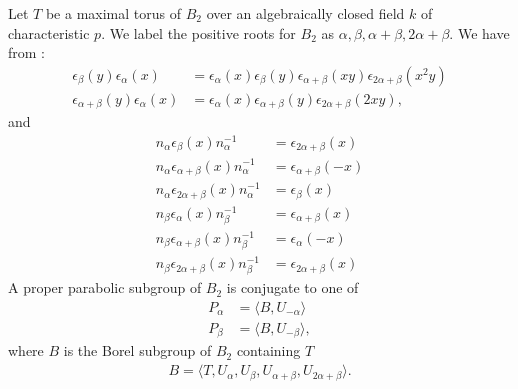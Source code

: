 																										Let $T$ be a maximal torus of $B_2$ over an algebraically closed field $k$ of characteristic $p$. We label the positive roots for $B_2$ as $\alpha, \beta, \alpha + \beta, 2\alpha + \beta$. We have from \cite[\S 33.4]{humphreys1975linear}:
																										\begin{align*}
																										\epsilon_\beta (y) \epsilon_\alpha (x) &= \epsilon_\alpha (x) \epsilon_\beta (y) \epsilon_{\alpha + \beta} (xy) \epsilon_{2\alpha+\beta} (x^2y) \\
																																															\epsilon_{\alpha + \beta} (y) \epsilon_\alpha (x) &= \epsilon_\alpha (x) \epsilon_{\alpha + \beta} (y) \epsilon_{2\alpha + \beta} (2xy),
																										\end{align*}
																										and 
																										\begin{align*}
																										n_\alpha \epsilon_\beta(x) n_\alpha^{-1} &= \epsilon_{2\alpha+\beta}(x)\\
																											n_\alpha \epsilon_{\alpha+\beta}(x) n_\alpha^{-1} &= \epsilon_{\alpha+\beta}(-x)\\
																											n_\alpha \epsilon_{2\alpha+\beta}(x) n_\alpha^{-1} &= \epsilon_{\beta}(x)\\
																											n_\beta \epsilon_\alpha(x) n_\beta^{-1} &= \epsilon_{\alpha+\beta}(x)\\
																											n_\beta \epsilon_{\alpha+\beta}(x) n_\beta^{-1} &= \epsilon_{\alpha}(-x)\\
																											n_\beta \epsilon_{2\alpha+\beta}(x) n_\beta^{-1} &= \epsilon_{2\alpha+\beta}(x)
																											\end{align*}
																											A proper parabolic subgroup of $B_2$ is conjugate to one of
																											\begin{align*}
																											P_\alpha &= \langle B, U_{-\alpha} \rangle\\
																																	P_\beta &= \langle B, U_{-\beta} \rangle,
																											\end{align*}
																											where $B$ is the Borel subgroup of $B_2$ containing $T$
																											\begin{align*}
																											B=\langle T, U_\alpha, U_\beta, U_{\alpha + \beta}, U_{2\alpha+\beta}\rangle.
																											\end{align*}
